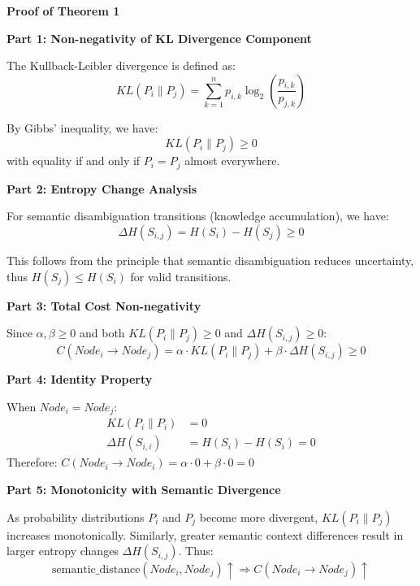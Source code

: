 \documentclass[11pt,a4paper]{article}
\begin{document}
\begin{proofbox}
\textbf{Proof of Theorem 1}

\textbf{Part 1: Non-negativity of KL Divergence Component}

The Kullback-Leibler divergence is defined as:
\begin{equation}
KL(P_i \parallel P_j) = \sum_{k=1}^{n} p_{i,k} \log_2\left(\frac{p_{i,k}}{p_{j,k}}\right)
\end{equation}

By Gibbs' inequality, we have:
\begin{equation}
KL(P_i \parallel P_j) \geq 0
\end{equation}
with equality if and only if $P_i = P_j$ almost everywhere.

\textbf{Part 2: Entropy Change Analysis}

For semantic disambiguation transitions (knowledge accumulation), we have:
\begin{equation}
\Delta H(S_{i,j}) = H(S_i) - H(S_j) \geq 0
\end{equation}

This follows from the principle that semantic disambiguation reduces uncertainty, thus $H(S_j) \leq H(S_i)$ for valid transitions.

\textbf{Part 3: Total Cost Non-negativity}

Since $\alpha, \beta \geq 0$ and both $KL(P_i \parallel P_j) \geq 0$ and $\Delta H(S_{i,j}) \geq 0$:
\begin{equation}
C(Node_i \rightarrow Node_j) = \alpha \cdot KL(P_i \parallel P_j) + \beta \cdot \Delta H(S_{i,j}) \geq 0
\end{equation}

\textbf{Part 4: Identity Property}

When $Node_i = Node_j$:
\begin{align}
KL(P_i \parallel P_i) &= 0 \\
\Delta H(S_{i,i}) &= H(S_i) - H(S_i) = 0
\end{align}
Therefore: $C(Node_i \rightarrow Node_i) = \alpha \cdot 0 + \beta \cdot 0 = 0$

\textbf{Part 5: Monotonicity with Semantic Divergence}

As probability distributions $P_i$ and $P_j$ become more divergent, $KL(P_i \parallel P_j)$ increases monotonically. Similarly, greater semantic context differences result in larger entropy changes $\Delta H(S_{i,j})$. Thus:
\begin{equation}
\text{semantic\_distance}(Node_i, Node_j) \uparrow \Rightarrow C(Node_i \rightarrow Node_j) \uparrow
\end{equation}
\end{proofbox}
\end{document}
